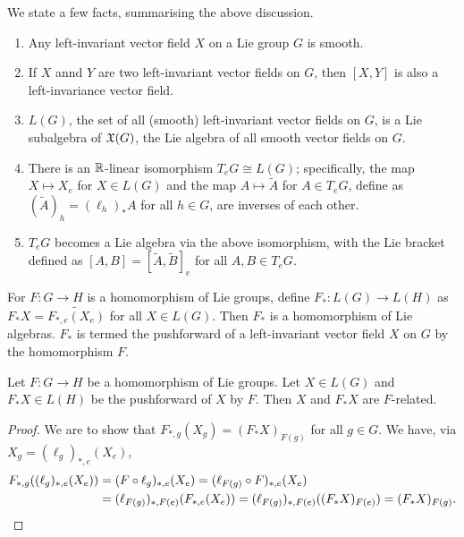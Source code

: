 We state a few facts, summarising the above discussion.
\begin{enumerate}
    \item Any left-invariant vector field $X$ on a Lie group $G$ is smooth.
    \item If $X$ annd $Y$ are two left-invariant vector fields on $G$, then $[X,Y]$ is also a left-invariance vector field.
    \item $L(G)$, the set of all (smooth) left-invariant vector fields on $G$, is a Lie subalgebra of $\mathfrak{X}(G)$, the Lie algebra of all smooth vector fields on $G$.
    \item There is an $\mathbb{R}$-linear isomorphism $T_{e}G \cong L(G)$; specifically, the map $X \mapsto X_{e}$ for $X \in L(G)$ and the map $A \mapsto \tilde{A}$ for $A \in T_{e}G$, define as $(\tilde{A})_{h} = (\ell_{h})_{\ast}A$ for all $h \in G$, are inverses of each other.
    \item $T_{e}G$ becomes a Lie algebra via the above isomorphism, with the Lie bracket defined as $[A,B] = [\tilde{A},\tilde{B}]_{e}$ for all $A,B \in T_{e}G$.
\end{enumerate}

For $F:G \to H$ is a homomorphism of Lie groups, define $F_{\ast}:L(G) \to L(H)$ as $F_{\ast}X = \widetilde{F_{\ast,e}(X_{e})}$ for all $X \in L(G)$. Then $F_{\ast}$ is a homomorphism of Lie algebras. $F_{\ast}$ is termed the pushforward of a left-invariant vector field $X$ on $G$ by the homomorphism $F$.

\begin{proposition}
    Let $F:G \to H$ be a homomorphism of Lie groups. Let $X \in L(G)$ and $F_{\ast}X \in L(H)$ be the pushforward of $X$ by $F$. Then $X$ and $F_{\ast}X$ are $F$-related.
\end{proposition}
\begin{proof}
    We are to show that $F_{\ast,g}(X_{g}) = (F_{\ast}X)_{F(g)}$ for all $g \in G$. We have, via $X_{g} = (\ell_{g})_{\ast,e}(X_{e})$,
    \begin{align}
        F_{\ast,g}((\ell_{g})_{\ast,e}(X_{e})) &= (F \circ \ell_{g})_{\ast,e}(X_{e}) = (\ell_{F(g)} \circ F)_{\ast,e}(X_{e}) \notag \\ &= (\ell_{F(g)})_{\ast,F(e)}(F_{\ast,e}(X_{e})) = (\ell_{F(g)})_{\ast,F(e)}((F_{\ast}X)_{F(e)}) = (F_{\ast}X)_{F(g)}.
    \end{align}
\end{proof}

